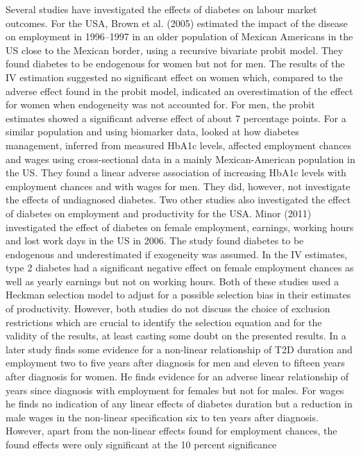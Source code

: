 Several studies have investigated the effects of diabetes on labour market outcomes. For the USA, Brown et al. (2005) estimated the impact of the disease on employment in 1996--1997 in an older population of Mexican Americans in the \ac{US} close to the Mexican border, using a recursive bivariate probit model. They found diabetes to be endogenous for women but not for men. The results of the \ac{IV} estimation suggested no significant effect on women which, compared to the adverse effect found in the probit model, indicated an overestimation of the effect for women when endogeneity was not accounted for. For men, the probit estimates showed a significant adverse effect of about 7 percentage points. For a similar population and using biomarker data,\citet{BrownIII2011} looked
at how diabetes management, inferred from measured \ac{HbA1c} levels,
affected employment chances and wages using cross-sectional data in
a mainly Mexican-American population in the US. They found a linear adverse association of increasing \ac{HbA1c} levels with
employment chances and with wages for men. They did, however, not investigate the effects of undiagnosed diabetes. Two other studies also investigated the effect of diabetes on employment and productivity for the USA. Minor (2011) investigated the effect of diabetes on female employment, earnings, working hours and lost work days in the \ac{US} in 2006. The study found diabetes to be endogenous and underestimated if exogeneity was assumed. In the \ac{IV} estimates, type 2 diabetes had a significant negative effect on female employment chances as well as yearly earnings but not on working hours. Both of these studies used a Heckman selection model to adjust for a possible selection bias in their estimates of productivity. However, both studies do not discuss the choice of exclusion restrictions which are crucial to identify the selection equation and for the validity of the results, at least casting some doubt on the presented results. In a later study \citet{Minor2013}
finds some evidence for a non-linear relationship of \ac{T2D} duration
and employment two to five years after diagnosis for men and eleven
to fifteen years after diagnosis for women. He finds evidence for
an adverse linear relationship of years since diagnosis with employment
for females but not for males. For wages he finds no indication of
any linear effects of diabetes duration but a reduction in male wages
in the non-linear specification six to ten years after diagnosis.
However, apart from the non-linear effects found for employment chances,
the found effects were only significant at the 10 percent significance
